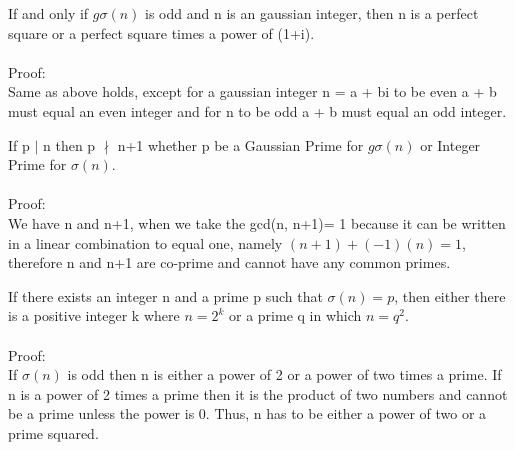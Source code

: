 \documentclass[12pt]{amsart}
\begin{document}
\thm
If and only if $g\sigma(n)$ is odd and n is an gaussian integer, then n is a perfect square or a perfect square times a power of (1+i).
\\
\\
\noindent
Proof:
\\
Same as above holds, except for a gaussian integer n = a + bi to be even a + b must equal an even integer and for n to be odd a + b must equal an odd integer. 

\thm
If p $\mid$ n then p $\nmid$ n+1 whether p be a Gaussian Prime for $g\sigma(n)$ or Integer Prime for $\sigma(n)$.
\\
\\
\noindent
Proof:
\\
We have n and n+1, when we take the gcd(n, n+1)= 1 because it can be written in a linear combination to equal one, namely $(n + 1) + (-1)(n) = 1$, therefore n and n+1 are co-prime and cannot have any common primes. 

\thm
If there exists an integer n and a prime p such that $\sigma(n) = p$, then either there is a positive integer k where $n = 2^k$ or a prime q in which $n = q^2$.
\\
\\
\noindent
Proof:
\\
If $\sigma(n)$ is odd then n is either a power of 2 or a power of two times a prime. If n is a power of 2 times a prime then it is the product of two numbers and cannot be a prime unless the power is 0. Thus, n has to be either a power of two or a prime squared.
\end{document}
